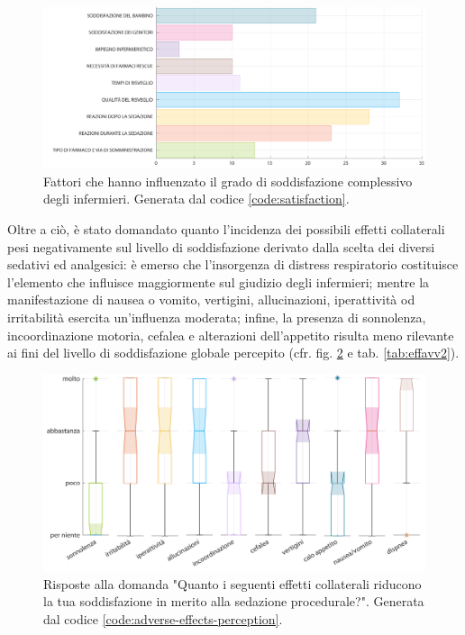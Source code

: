 \begin{figure}[!h]
    \centering
    \includegraphics[width=1\textwidth]{Figure/soddisfazione-globale.pdf}
    \caption{Fattori che hanno influenzato il grado di soddisfazione complessivo degli infermieri. Generata dal codice \ref{code:satisfaction}.}
    \label{fig:soddglobale}
\end{figure}

\newpage
Oltre a ciò, è stato domandato quanto l'incidenza dei possibili effetti collaterali pesi negativamente sul livello di soddisfazione derivato dalla scelta dei diversi sedativi ed analgesici: è emerso che l'insorgenza di distress respiratorio costituisce l'elemento che influisce maggiormente sul giudizio degli infermieri; mentre la manifestazione di nausea o vomito, vertigini, allucinazioni, iperattività od irritabilità esercita un'influenza moderata; infine, la presenza di sonnolenza, incoordinazione motoria, cefalea e alterazioni dell'appetito risulta meno rilevante ai fini del livello di soddisfazione globale percepito (cfr. fig. \ref{fig:influenzaeffetti} e tab. \ref{tab:effavv2}). 

\vfill

\begin{figure}[!ht]
    \centering
    \includegraphics[width=1\textwidth]{Figure/influenza-effetti.pdf}
    \caption{Risposte alla domanda "Quanto i seguenti effetti collaterali riducono la tua soddisfazione in merito alla sedazione procedurale?". Generata dal codice \ref{code:adverse-effects-perception}.}
    \label{fig:influenzaeffetti}
\end{figure}

